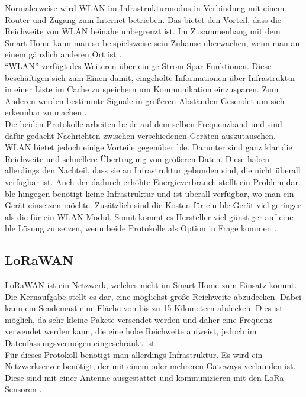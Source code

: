 \noindent Normalerweise wird WLAN im Infrastrukturmodus in Verbindung mit einem Router und Zugang zum Internet betrieben. Das bietet den Vorteil, dass die Reichweite von WLAN beinahe unbegrenzt ist. Im Zusammenhang mit dem Smart Home kann man so beispielsweise sein Zuhause überwachen, wenn man an einem gänzlich anderen Ort ist \cite{MUE:Wlan}.\\

\noindent "`WLAN"' verfügt des Weiteren über einige Strom Spar Funktionen. Diese beschäftigen sich zum Einen damit, eingeholte Informationen über Infrastruktur in einer Liste im Cache zu speichern um Kommunikation einzusparen. Zum Anderen werden bestimmte Signale in größeren Abständen Gesendet um sich erkennbar zu machen \cite[Seite 242]{Gessler14:WNN}.\\

\noindent Die beiden Protokolle arbeiten beide auf dem selben Frequenzband und sind dafür gedacht Nachrichten zwischen verschiedenen Geräten auszutauschen. WLAN bietet jedoch einige Vorteile gegenüber \ac{ble}. Darunter sind ganz klar die Reichweite und schnellere Übertragung von größeren Daten. Diese haben allerdings den Nachteil, dass sie an Infrastruktur gebunden sind, die nicht überall verfügbar ist. Auch der dadurch erhöhte Energieverbrauch stellt ein Problem dar. \ac{ble} hingegen benötigt keine Infrastruktur und ist überall verfügbar, wo man ein Gerät einsetzen möchte. Zusätzlich sind die Kosten für ein \ac{ble} Gerät viel geringer als die für ein WLAN Modul. Somit kommt es Hersteller viel günstiger auf eine \ac{ble} Lösung zu setzen, wenn beide Protokolle als Option in Frage kommen \cite[Seite 271]{Gessler14:WNN}.\\ 

\subsection{LoRaWAN}
\label{ss:vergleich:lora}

LoRaWAN ist ein Netzwerk, welches nicht im Smart Home zum Einsatz kommt. Die Kernaufgabe stellt es dar, eine möglichst große Reichweite abzudecken. Dabei kann ein Sendemast eine Fläche von bis zu 15 Kilometern abdecken. Dies ist möglich, da sehr kleine Pakete versendet werden und daher eine Frequenz verwendet werden kann, die eine hohe Reichweite aufweist, jedoch im Datenfassungsvermögen eingeschränkt ist.\\

\noindent Für dieses Protokoll benötigt man allerdings Infrastruktur. Es wird ein Netzwerkserver benötigt, der mit einem oder mehreren Gateways verbunden ist. Diese sind mit einer Antenne ausgestattet und kommunizieren mit den LoRa Sensoren \cite{LO:WWW}.\\

